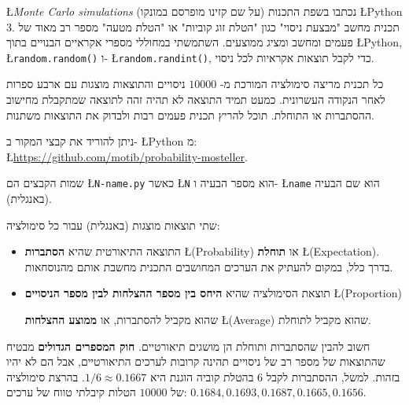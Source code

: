 \L{\emph{Monte Carlo simulations}}
(על שם קזינו מופרסם במונקו) נכתבו בשפת התכנות
\L{Python 3}.
תכנית מחשב "מבצעת ניסוי" כגון "הטלת זוג קוביות" או "הטלת מטעה" מספר רב מאוד של פעמים ומחשב ומציג ממוצעים. השתמשתי במחוללי מספרי אקראיים הבנויים בתוך
\L{Python},
\L{\texttt{random.random()}}
ו-%
\L{\texttt{random.randint()}},
כדי לקבל תוצאות אקראיות לכל ניסוי.

כל תכנית מריצה סימולציה המורכת מ-%
$10000$
ניסויים והתוצאות מוצגות עם ארבע ספרות לאחר הנקודה העשרונית. כמעט תמיד התוצאה לא תהיה זהה לתוצאה שמתקבלת מחישוב ההסתברות או התוחלת. תוכל להריץ תכנית פעמים רבות ולבדוק את התוצאות משתנות.

ניתן להוריד את קבצי המקור ב-%
\L{Python}
מ:\\
\L{\url{https://github.com/motib/probability-mosteller}}.

שמות הקבצים הם 
\L{\texttt{N-name.py}}
כאשר
\L{\texttt{N}}
הוא מספר הבעיה ו-%
\L{\texttt{name}}
הוא שם הבעיה (באנגלית).

שתי תוצאות מוצגות (באנגלית) עבור כל סימולציה:
\begin{itemize}
\item
התוצאה התיאורטית שהיא 
\textbf{הסתברות}
\L{(Probability)}
או
\textbf{תוחלת}
\L{(Expectation)}.
בדרך כלל, במקום להעתיק את הערכים המחושבים התכנית מחשבת אותם מהנוסחאות.
\item
תוצאת הסימולציה שהיא
\textbf{היחס בין מספר ההצלחות לבין מספר הניסויים}
\L{(Proportion)}

שהוא מקביל להסתברות, או
\textbf{ממוצע ההצלחות}
\L{(Average)}
שהוא מקביל לתוחלת.
\end{itemize}
חשוב להבין שהסתברות ותוחלת הן מושגים תיאורטיים. 
\textbf{חוק המספרים הגדולים}
מבטיח שהתוצאות של מספר רב של ניסויים תהינה קרובות לערכים התיאורטיים, אבל הם לא יהיו בזהות. למשל, ההסתברות לקבל 
$6$
בהטלת קוביה הוגנת היא
$1/6\approx 0.1667$.
בהרצת סימולציה של 
$10000$
הטלות קיבלתי טווח של ערכים:
$0.1684, 0.1693, 0.1687, 0.1665, 0.1656$.

\newpage
